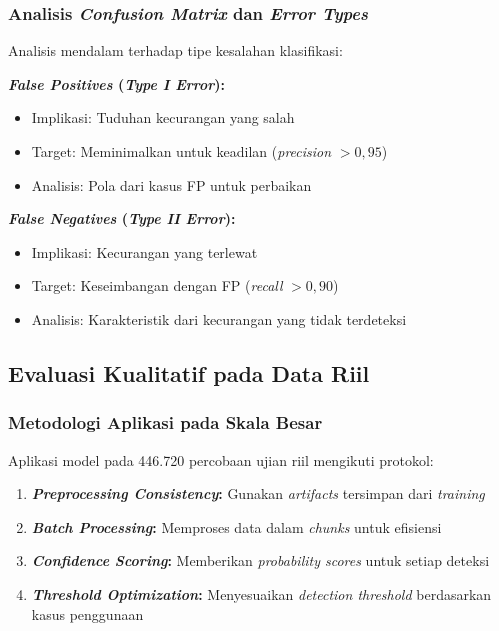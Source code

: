 \subsubsection{Analisis \textit{Confusion Matrix} dan \textit{Error Types}}
\label{sec:confusionMatrixAnalysis}

Analisis mendalam terhadap tipe kesalahan klasifikasi:

\textbf{\textit{False Positives} (\textit{Type I Error}):}
\begin{itemize}
    \item Implikasi: Tuduhan kecurangan yang salah
    \item Target: Meminimalkan untuk keadilan (\textit{precision} $> 0,95$)
    \item Analisis: Pola dari kasus FP untuk perbaikan
\end{itemize}

\textbf{\textit{False Negatives} (\textit{Type II Error}):}
\begin{itemize}
    \item Implikasi: Kecurangan yang terlewat
    \item Target: Keseimbangan dengan FP (\textit{recall} $> 0,90$)
    \item Analisis: Karakteristik dari kecurangan yang tidak terdeteksi
\end{itemize}

\subsection{Evaluasi Kualitatif pada Data Riil}
\label{sec:evaluasiKualitatif}

\subsubsection{Metodologi Aplikasi pada Skala Besar}
\label{sec:aplikasiSkalaBesar}

Aplikasi model pada 446.720 percobaan ujian riil mengikuti protokol:

\begin{enumerate}
    \item \textbf{\textit{Preprocessing Consistency}:} Gunakan \textit{artifacts} tersimpan dari \textit{training}
    \item \textbf{\textit{Batch Processing}:} Memproses data dalam \textit{chunks} untuk efisiensi
    \item \textbf{\textit{Confidence Scoring}:} Memberikan \textit{probability scores} untuk setiap deteksi
    \item \textbf{\textit{Threshold Optimization}:} Menyesuaikan \textit{detection threshold} berdasarkan kasus penggunaan
\end{enumerate}

